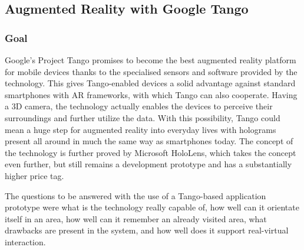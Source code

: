 \documentclass[12pt, a4paper]{article}
\begin{document}
\subsection{Augmented Reality with Google Tango}
\subsubsection{Goal}
Google’s Project Tango promises to become the best augmented reality platform for mobile devices thanks to the specialised sensors and software provided by the technology. This gives Tango-enabled devices a solid advantage against standard smartphones with AR frameworks, with which Tango can also cooperate. Having a 3D camera, the technology actually enables the devices to perceive their surroundings and further utilize the data. With this possibility, Tango could mean a huge step for augmented reality into everyday lives with holograms present all around in much the same way as smartphones today. The concept of the technology is further proved by Microsoft HoloLens, which takes the concept even further, but still remains a development prototype and has a substantially higher price tag.

The questions to be answered with the use of a Tango-based application prototype were what is the technology really capable of, how well can it orientate itself in an area, how well can it remember an already visited area, what drawbacks are present in the system, and how well does it support real-virtual interaction.
\end{document}
